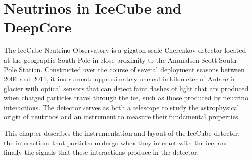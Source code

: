 \setchapterpreamble[u]{\margintoc}
\chapter{Neutrinos in IceCube and DeepCore}

The IceCube Neutrino Observatory is a gigaton-scale Cherenkov detector located at the geographic South Pole in close proximity to the Amundsen-Scott South Pole Station. Constructed over the course of several deployment seasons between 2006 and 2011, it instruments approximately one cubic-kilometer of Antarctic glacier with optical sensors that can detect faint flashes of light that are produced when charged particles travel through the ice, such as those produced by neutrino interactions. The detector serves as both a telescope to study the astrophysical origin of neutrinos and an instrument to measure their fundamental properties.

This chapter describes the instrumentation and layout of the IceCube detector, the interactions that particles undergo when they interact with the ice, and finally the signals that these interactions produce in the detector.







% 
% 
